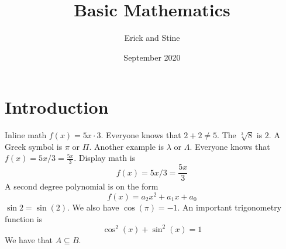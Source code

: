 \documentclass{article}
\title{Basic Mathematics}
\author{Erick and Stine}
\date{September 2020}
\begin{document}
\maketitle
 
\section{Introduction}
Inline math $f(x) = 5x \cdot 3$. %
Everyone knows that $2 + 2 \neq 5$. The $\sqrt[3]{8}$ is $2$. A Greek symbol is $\pi$ or $\Pi$. Another example is $\lambda$ or $\Lambda$. Everyone knows that $f(x) = 5x/3 = \frac{5x}{3}$. Display math is \[f(x) = 5x/3 = \frac{5x}{3}\] A second degree polynomial is on the form \[f(x) = a_{2}x^{2} + a_{1}x + a_{0}\]
$\sin{2} = \sin(2)$. We also have $\cos(\pi) = -1$. An important trigonometry function is \[\cos^{2}(x) + \sin^{2}(x) = 1\]
We have that $A \subseteq B$.
\end{document}
